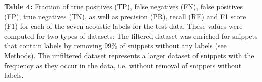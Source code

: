 \documentclass[11pt]{article}
\begin{document}
\begin{table}[h]
    \centering
    \caption*{\textbf{Table 4:} Fraction of true positives (TP), false negatives (FN), false positives (FP), true negatives (TN), as well as precision (PR), recall (RE) and F1 score (F1) for each of the seven acoustic labels for the test data. These values were computed for two types of datasets: The filtered dataset was enriched for snippets that contain labels by removing 99\% of snippets without any labels (see Methods). The unfiltered dataset represents a larger dataset of snippets with the frequency as they occur in the data, i.e. without removal of snippets without labels.}
    \small
    
\end{table}
\end{document}
